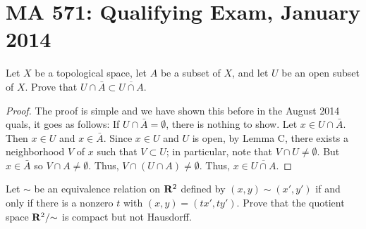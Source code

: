 \chapter{MA 571: Qualifying Exam, January 2014}
\begin{problem}
Let $X$ be a topological space, let $A$ be a subset of $X$, and let $U$ be
an open subset of $X$. Prove that $U\cap\bar A\subset\overline{U\cap A}$.
\end{problem}
\begin{proof}
The proof is simple and we have shown this before in the August 2014
quals, it goes as follows: If $U\cap\bar A=\emptyset$, there is nothing to
show. Let $x\in U\cap\bar A$. Then $x\in U$ and $x\in\bar A$. Since $x\in
U$ and $U$ is open, by Lemma C, there exists a neighborhood $V$ of $x$ such
that $V\subset U$; in particular, note that $V\cap U\neq\emptyset$. But
$x\in\bar A$ so $V\cap A\neq\emptyset$. Thus, $V\cap(U\cap
A)\neq\emptyset$. Thus, $x\in\overline{U\cap A}$.
\end{proof}
\begin{problem}
Let $\sim$ be an equivalence relation on $\mathbf{R}^2$ defined by
$(x,y)\sim(x',y')$ if and only if there is a nonzero $t$ with
$(x,y)=(tx',ty')$. Prove that the quotient space $\mathbf{R}^2/{\sim}$ is compact
but not Hausdorff.
\end{problem}
